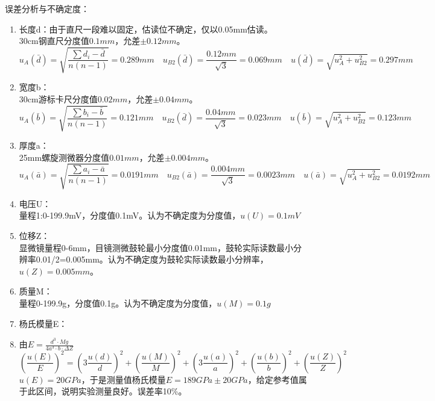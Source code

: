 \documentclass[11pt]{article}
\begin{document}
\vspace*{1em}
\par \noindent 误差分析与不确定度：
\begin{enumerate}
    \item 长度d：由于直尺一段难以固定，估读位不确定，仅以0.05mm估读。
    \\ 30cm钢直尺分度值$0.1mm$，允差$\pm 0.12mm$。
    \[u_A(\bar{d})=\sqrt{\frac{\sum d_i-\bar{d}}{n(n-1)}}=0.289mm \quad u_{B2}(\bar{d})=\frac{0.12mm}{\sqrt{3}}=0.069mm\quad u(\bar{d})=\sqrt{u_A^2+u_{B2}^2}=0.297mm\]
    \item 宽度b：
    \\ 30cm游标卡尺分度值$0.02mm$，允差$\pm 0.04mm$。
    \[u_A(\bar{b})=\sqrt{\frac{\sum b_i-\bar{b}}{n(n-1)}}=0.121mm\quad u_{B2}(\bar{d})=\frac{0.04mm}{\sqrt{3}}=0.023mm\quad u(\bar{b})=\sqrt{u_A^2+u_{B2}^2}=0.123mm\]
    \item 厚度a：
    \\ 25mm螺旋测微器分度值$0.01mm$，允差$\pm 0.004mm$。
    \[u_A(\bar{a})=\sqrt{\frac{\sum a_i-\bar{a}}{n(n-1)}}=0.0191mm\quad u_{B2}(\bar{a})=\frac{ 0.004mm}{\sqrt{3}}=0.0023mm\quad u(\bar{a})=\sqrt{u_A^2+u_{B2}^2}=0.0192mm\]
    \item 电压U：
    \\ 量程1:0-199.9mV，分度值0.1mV。认为不确定度为分度值，$u(U)=0.1mV$
    \item 位移Z：
    \\ 显微镜量程0-6mm，目镜测微鼓轮最小分度值0.01mm，鼓轮实际读数最小分辨率0.01/2=0.005mm。认为不确定度为鼓轮实际读数最小分辨率，$u(Z)=0.005mm$。
    \item 质量M：
    \\ 量程0-199.9g，分度值0.1g。认为不确定度为分度值，$u(M)=0.1g$
    \item 杨氏模量E：
    \item 由$E=\frac{d^3\cdot M g}{4a^3\cdot b\cdot\Delta Z}$
    \[{\left(\frac{u(E)}{E}\right)}^2={\left(3\frac{u(d)}{d}\right)}^2+{\left(\frac{u(M)}{M}\right)}^2+{\left(3\frac{u(a)}{a}\right)}^2+{\left(\frac{u(b)}{b}\right)}^2+{\left(\frac{u(Z)}{Z}\right)}^2\]
    $u(E)=20GPa$，于是测量值杨氏模量$E=189GPa \pm 20GPa$，给定参考值属于此区间，说明实验测量良好。误差率10\%。
\end{enumerate}
\end{document}
